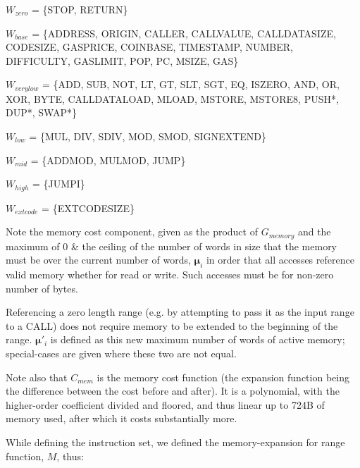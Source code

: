 \documentclass[9pt,oneside]{amsart}
\begin{document}
$W_{zero}$ = \{{\small STOP}, {\small RETURN}\}

$W_{base}$ = \{{\small ADDRESS}, {\small ORIGIN}, {\small CALLER}, {\small CALLVALUE}, {\small CALLDATASIZE}, {\small CODESIZE}, {\small GASPRICE}, {\small COINBASE},\newline \noindent\hspace*{1cm} {\small TIMESTAMP}, {\small NUMBER}, {\small DIFFICULTY}, {\small GASLIMIT}, {\small POP}, {\small PC}, {\small MSIZE}, {\small GAS}\}

$W_{verylow}$ = \{{\small ADD}, {\small SUB}, {\small NOT}, {\small LT}, {\small GT}, {\small SLT}, {\small SGT}, {\small EQ}, {\small ISZERO}, {\small AND}, {\small OR}, {\small XOR}, {\small BYTE}, {\small CALLDATALOAD}, \newline \noindent\hspace*{1cm} {\small MLOAD}, {\small MSTORE}, {\small MSTORE8}, {\small PUSH*}, {\small DUP*}, {\small SWAP*}\}

$W_{low}$ = \{{\small MUL}, {\small DIV}, {\small SDIV}, {\small MOD}, {\small SMOD}, {\small SIGNEXTEND}\}

$W_{mid}$ = \{{\small ADDMOD}, {\small MULMOD}, {\small JUMP}\}

$W_{high}$ = \{{\small JUMPI}\}

$W_{extcode}$ = \{{\small EXTCODESIZE}\}

Note the memory cost component, given as the product of $G_{memory}$ and the maximum of 0 \& the ceiling of the number of words in size that the memory must be over the current number of words, $\boldsymbol{\mu}_i$ in order that all accesses reference valid memory whether for read or write. Such accesses must be for non-zero number of bytes.

Referencing a zero length range (e.g. by attempting to pass it as the input range to a CALL) does not require memory to be extended to the beginning of the range. $\boldsymbol{\mu}'_i$ is defined as this new maximum number of words of active memory; special-cases are given where these two are not equal.

Note also that $C_{mem}$ is the memory cost function (the expansion function being the difference between the cost before and after). It is a polynomial, with the higher-order coefficient divided and floored, and thus linear up to 724B of memory used, after which it costs substantially more.

While defining the instruction set, we defined the memory-expansion for range function, $M$, thus:
\end{document}
